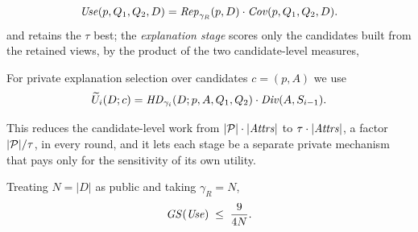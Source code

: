 \begin{equation}
\mathit{Use}(p,Q_1,Q_2,D)= \mathit{Rep}_{\gamma_R}(p,D)\cdot \mathit{Cov}(p,Q_1,Q_2,D).
\label{eq:usefulness-proxy}
\end{equation}
and retains the $\tau$ best; the \emph{explanation stage} scores only the candidates built from the retained views, by the product of the two candidate-level measures,

For private explanation selection over candidates $c=(p,A)$ we use
\begin{equation}
\widetilde{U}_i(D;c)=\mathit{HD}_{\gamma_i}(D;p,A,Q_1,Q_2)\cdot \mathit{Div}(A,S_{i-1}).
\label{eq:selection-utility}
\end{equation}


This reduces the candidate-level work from $|\mathcal{P}|\cdot|\mathit{Attrs}|$ to $\tau\cdot|\mathit{Attrs}|$, a factor $|\mathcal{P}|/\tau$, in every round, and it lets each stage be a separate private mechanism that pays only for the sensitivity of its own utility.



\begin{proposition}
\label{prop:usefulness-sensitivity}
Treating $N=|D|$ as public and taking $\gamma_R=N$,
\[
\mathit{GS}(\mathit{Use})\;\le\;\frac{9}{4N}.
\]
\end{proposition}

